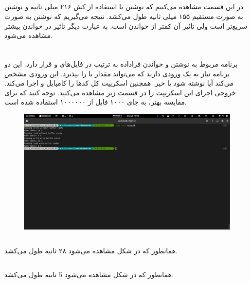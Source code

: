 \documentclass{article}
\begin{document}
\subsection{}
در این قسمت مشاهده می‌کنیم که نوشتن با استفاده از کش 
۲۱۶ میلی ثانیه 
و نوشتن به صورت مستقیم ۱۵۵ میلی ثانیه طول می‌کشد.
نتیجه می‌گیریم که نوشتن به صورت 
سریع‌تر است ولی تاثیر آن کمتر از خواندن است. به عبارت دیگر تاثیر 
در خواندن بیشتر مشاهده می‌شود.

\section{}
برنامه مربوط به نوشتن و خواندن فراداده به ترتیب در فایل‌های
و
قرار دارد. این دو برنامه نیاز به یک ورودی دارند که می‌تواند مقدار 
یا
را بپذیرد. این ورودی مشخص می‌کند 
آیا 
نوشته شود یا خیر. همچنین اسکریپت
کل کد‌ها را کامپایل و اجرا می‌کند. خروجی اجرای این اسکریپت را در قسمت زیر مشاهده می‌کنید.
توجه کنید که برای مقایسه بهتر، به جای ۱۰۰۰ فایل از ۱۰۰۰۰۰۰ 
استفاده شده است.

\begin{figure}[H]
    \centering
    \includegraphics[width=\textwidth]{images/2.png}
\end{figure}

\subsection{}
همانطور که در شکل مشاهده می‌شود ۲۸ ثانیه طول می‌کشد.

\subsection{}
همانطور که در شکل مشاهده می‌شود 5 ثانیه طول می‌کشد.
\end{document}
